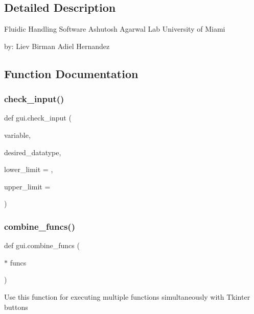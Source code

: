 \subsection{Detailed Description}
\begin{DoxyVerb}Fluidic Handling Software
Ashutosh Agarwal Lab
University of Miami

by:
Liev Birman
Adiel Hernandez
\end{DoxyVerb}
 

\subsection{Function Documentation}
\mbox{\label{namespacegui_a112dfa5ddd7d9664cf21062f7e725ce8}} 
\subsubsection{\texorpdfstring{check\_input()}{check\_input()}}
{\footnotesize\ttfamily def gui.\+check\+\_\+input (\begin{DoxyParamCaption}\item[{}]{variable,  }\item[{}]{desired\+\_\+datatype,  }\item[{}]{lower\+\_\+limit = {},  }\item[{}]{upper\+\_\+limit = {} }\end{DoxyParamCaption})}

\mbox{\label{namespacegui_a8b03c359da973f07d331b9f8bacf8a06}} 
\subsubsection{\texorpdfstring{combine\_funcs()}{combine\_funcs()}}
{\footnotesize\ttfamily def gui.\+combine\+\_\+funcs (\begin{DoxyParamCaption}\item[{$\ast$}]{funcs }\end{DoxyParamCaption})}

\begin{DoxyVerb}Use this function for executing multiple functions simultaneously with Tkinter buttons\end{DoxyVerb}
 \mbox{\label{namespacegui_a287ef9f754edef8c39da895297753642}} 
